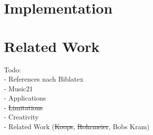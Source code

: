 \documentclass[a4paper,11pt, fleqn]{article}
\date{\today}
\author{Thats Me}
\begin{document}

\tableofcontents 

\clearpage


\clearpage
\section{Implementation}









\clearpage
\section{Related Work}



\clearpage


\clearpage
\noindent
Todo:\\
- References nach Biblatex\\
- Music21\\
- Applications\\
- \sout{Limitations}\\
- Creativity\\
- Related Work (\sout{Koops}, \sout{Rohrmeier}, Bobs Kram)

%

\printbibliography
\end{document}
